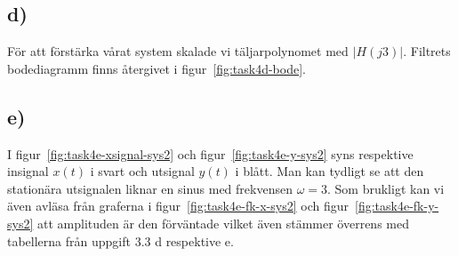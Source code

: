\subsection*{d)}
För att förstärka vårat system skalade vi täljarpolynomet med $|H(j3)|$.
Filtrets bodediagramm finns återgivet i figur~\ref{fig:task4d-bode}.

\subsection*{e)}
I figur~\ref{fig:task4e-xsignal-sys2} och figur~\ref{fig:task4e-y-sys2}
syns respektive insignal $x(t)$ i svart och utsignal $y(t)$ i blått. Man kan
tydligt se att den stationära utsignalen liknar en sinus med frekvensen $\omega
= 3$. Som brukligt kan vi även avläsa från graferna i
figur~\ref{fig:task4e-fk-x-sys2} och figur~\ref{fig:task4e-fk-y-sys2} att
amplituden är den förväntade vilket även stämmer överrens med tabellerna från
uppgift 3.3 d respektive e.
